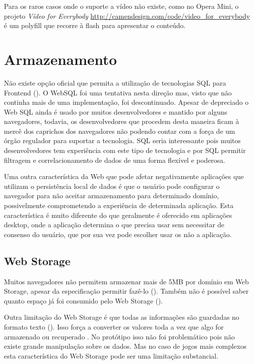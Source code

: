 Para os raros casos onde o suporte a vídeo não existe,
como no Opera Mini, o projeto \textit{Vídeo for Everybody}
\url{http://camendesign.com/code/video_for_everybody} é um polyfill que
recorre à flash para apresentar o conteúdo.

\section{Armazenamento}

Não existe opção oficial que permita a utilização de tecnologias
SQL para Frontend (). O WebSQL foi uma
tentativa nesta direção mas, visto que não continha mais de uma
implementação, foi descontinuado. Apesar de depreciado o Web SQL ainda
é usado por muitos desenvolvedores e mantido por alguns navegadores,
todavia, os desenvolvedores que procedem desta maneira ficam à mercê
dos caprichos dos navegadores não podendo contar com a força de um
órgão regulador para suportar a tecnologia. SQL seria interessante pois
muitos desenvolvedores tem experiência com este tipo de tecnologia e
por SQL permitir filtragem e correlacionamento de dados de uma forma
flexível e poderosa.

Uma outra característica da Web que pode afetar negativamente
aplicações que utilizam o persistência local de dados é que o
usuário pode configurar o navegador para não aceitar armazenamento
para determinado domínio, possivelmente comprometendo a experiência
de determinada aplicação. Esta característica é muito diferente do
que geralmente é oferecido em aplicações desktop, onde a aplicação
determina o que precisa usar sem necessitar de consenso do usuário, que
por sua vez pode escolher usar os não a aplicação.

\subsection{Web Storage}

Muitos navegadores não permitem armazenar mais de 5MB por domínio
em Web Storage, apesar da especificação permitir fazê-lo
\autocite{gameAssetManagement} (). Também
não é possível saber quanto espaço já foi consumido pelo Web
Storage ().

Outra limitação do Web Storage é que todas as informações são
guardadas no formato texto (). Isso
força a converter os valores toda a vez que algo for armazenado ou
recuperado \autocite{gameAssetManagement}. No protótipo isso não foi
problemático pois não existe grande manipulação sobre os dados. Mas
no caso de jogos mais complexos esta característica do Web Storage pode
ser uma limitação substancial.

